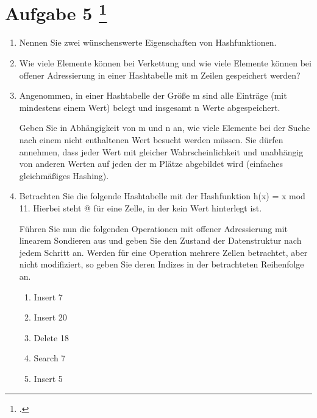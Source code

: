 \documentclass{lehramt-informatik-aufgabe}
\begin{document}
\section{Aufgabe 5
\footcite{66115:2021:03}}
\begin{enumerate}


\item Nennen Sie zwei wünschenswerte Eigenschaften von Hashfunktionen.


\item Wie viele Elemente können bei Verkettung und wie viele Elemente
können bei offener Adressierung in einer Hashtabelle mit m Zeilen
gespeichert werden?


\item Angenommen, in einer Hashtabelle der Größe m sind alle Einträge (mit mindestens einem
Wert) belegt und insgesamt n Werte abgespeichert.

Geben Sie in Abhängigkeit von m und n an, wie viele Elemente bei der Suche nach einem
nicht enthaltenen Wert besucht werden müssen. Sie dürfen annehmen, dass jeder Wert mit
gleicher Wahrscheinlichkeit und unabhängig von anderen Werten auf jeden der m Plätze
abgebildet wird (einfaches gleichmäßiges Hashing).


\item Betrachten Sie die folgende Hashtabelle mit der Hashfunktion h(x) = x mod 11. Hierbei
steht @ für eine Zelle, in der kein Wert hinterlegt ist.

Führen Sie nun die folgenden Operationen mit offener Adressierung mit linearem Sondieren
aus und geben Sie den Zustand der Datenstruktur nach jedem Schritt an. Werden für eine
Operation mehrere Zellen betrachtet, aber nicht modifiziert, so geben Sie deren Indizes in
der betrachteten Reihenfolge an.

\begin{enumerate}


\item Insert 7

\item Insert 20

\item Delete 18

\item Search 7


\item Insert 5
\end{enumerate}

\end{enumerate}
\end{document}
